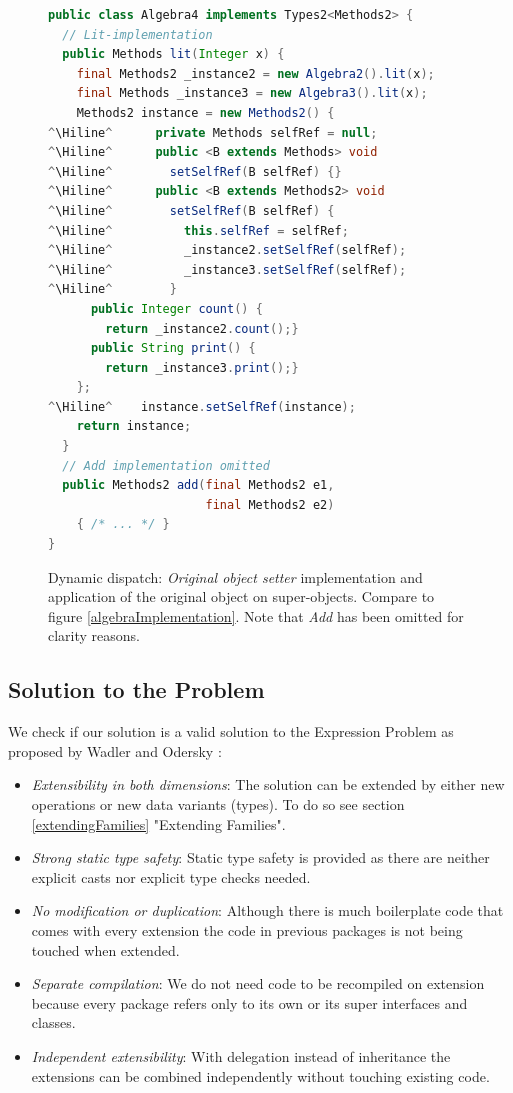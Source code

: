 \documentclass{report}
\newcommand{\Hiline}{\makebox[0pt][l]{\color[rgb]{1,0.96,0.98}\rule[-4pt]{\linewidth}{12.5pt}}}
\begin{document}
\begin{figure}[H]
\begin{lstlisting}[language=java]
public class Algebra4 implements Types2<Methods2> {
  // Lit-implementation
  public Methods lit(Integer x) {
    final Methods2 _instance2 = new Algebra2().lit(x);
    final Methods _instance3 = new Algebra3().lit(x);
    Methods2 instance = new Methods2() {
^\Hiline^      private Methods selfRef = null;
^\Hiline^      public <B extends Methods> void
^\Hiline^        setSelfRef(B selfRef) {}
^\Hiline^      public <B extends Methods2> void
^\Hiline^        setSelfRef(B selfRef) {
^\Hiline^          this.selfRef = selfRef;
^\Hiline^          _instance2.setSelfRef(selfRef);
^\Hiline^          _instance3.setSelfRef(selfRef);
^\Hiline^        }
      public Integer count() {
        return _instance2.count();}
      public String print() {
        return _instance3.print();}
    };
^\Hiline^    instance.setSelfRef(instance);
    return instance;
  }
  // Add implementation omitted
  public Methods2 add(final Methods2 e1,
                      final Methods2 e2)
    { /* ... */ }
}
\end{lstlisting}
\caption{Dynamic dispatch: \emph{Original object setter} implementation and application of the original object on super-objects. Compare to figure \ref{algebraImplementation}. Note that \emph{Add} has been omitted for clarity reasons.}
\label{dynamicDispatchAlgebra}
\end{figure}

\subsection{Solution to the Problem}

We check if our solution is a valid solution to the Expression Problem as proposed by Wadler and Odersky \cite{Wadler-Expression-1998, Odersky-Expression-2005}:

\begin{itemize}
  \item \emph{Extensibility in both dimensions}: The solution can be extended by either new operations or new data variants (types). To do so see section \ref{extendingFamilies} "Extending Families".
  \item \emph{Strong static type safety}: Static type safety is provided as there are neither explicit casts nor explicit type checks needed.
  \item \emph{No modification or duplication}: Although there is much boilerplate code that comes with every extension the code in previous packages is not being touched when extended.
  \item \emph{Separate compilation}: We do not need code to be recompiled on extension because every package refers only to its own or its super interfaces and classes.
  \item \emph{Independent extensibility}: With delegation instead of inheritance the extensions can be combined independently without touching existing code.
\end{itemize}
\end{document}
